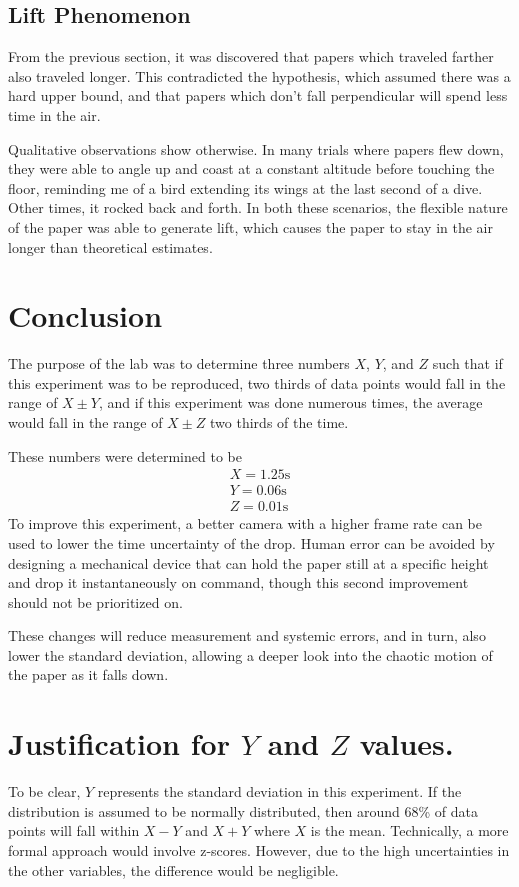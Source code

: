 \documentclass[%
 reprint,
 amsmath,amssymb,
 aps,
]{revtex4-2}
\begin{document}
\subsection{Lift Phenomenon}
From the previous section, it was discovered that papers which traveled farther also traveled longer. This contradicted the hypothesis, which assumed there was a hard upper bound, and that papers which don't fall perpendicular will spend less time in the air.

Qualitative observations show otherwise. In many trials where papers flew down, they were able to angle up and coast at a constant altitude before touching the floor, reminding me of a bird extending its wings at the last second of a dive. Other times, it rocked back and forth. In both these scenarios, the flexible nature of the paper was able to generate lift, which causes the paper to stay in the air longer than theoretical estimates.

\section{Conclusion}
The purpose of the lab was to determine three numbers $X$, $Y$, and $Z$ such that if this experiment was to be reproduced, two thirds of data points would fall in the range of $X\pm Y$, and if this experiment was done numerous times, the average would fall in the range of $X \pm Z$ two thirds of the time.

These numbers were determined to be \begin{align*} 
    X=1.25 \si{\second} \\
    Y=0.06\si{\second} \\ 
    Z=0.01\si{\second}
\end{align*}
To improve this experiment, a better camera with a higher frame rate can be used to lower the time uncertainty of the drop. Human error can be avoided by designing a mechanical device that can hold the paper still at a specific height and drop it instantaneously on command, though this second improvement should not be prioritized on.

These changes will reduce measurement and systemic errors, and in turn, also lower the standard deviation, allowing a deeper look into the chaotic motion of the paper as it falls down.

\onecolumngrid



\newpage
\appendix

\section{Justification for $Y$ and $Z$ values.}
To be clear, $Y$ represents the standard deviation in this experiment. If the distribution is assumed to be normally distributed, then around 68\% of data points will fall within $X-Y$ and $X+Y$ where $X$ is the mean. Technically, a more formal approach would involve z-scores. However, due to the high uncertainties in the other variables, the difference would be negligible.
\end{document}
